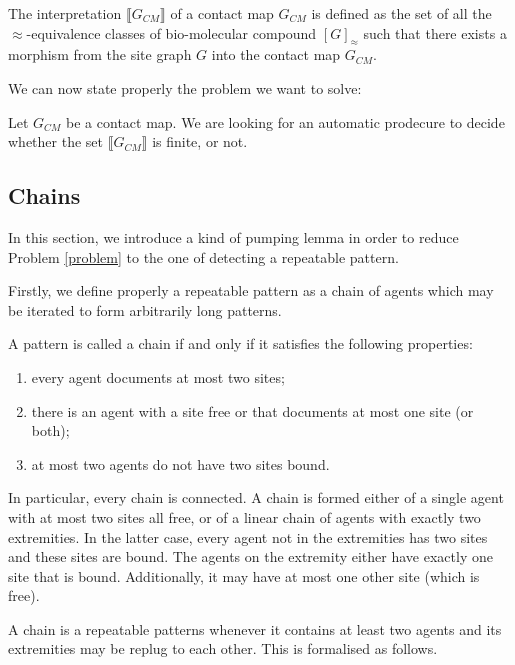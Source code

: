 \documentclass{entcs}
\newcommand{\graphsymb}{G}
\newcommand{\iso}{\approx}
\begin{document}
\begin{defn}
The interpretation $\llbracket \graphsymb_{\textit{CM}} \rrbracket$ of a contact map $\graphsymb_{\textit{CM}}$ is defined as the set of all the $\iso$-equivalence classes of bio-molecular compound $[G]_{\iso}$ such that there exists a morphism from the site graph $G$ into the contact map $\graphsymb_{\textit{CM}}$.
\end{defn}

We can now state properly the problem we want to solve:
\begin{problem}\label{problem}
Let $\graphsymb_{\textit{CM}}$ be a contact map.
We are looking for an automatic prodecure to decide whether
the set $\llbracket \graphsymb_{\textit{CM}} \rrbracket$ is finite, or not.
\end{problem}

\subsection{Chains}

In this section, we introduce a kind of pumping lemma in order to reduce
Problem \ref{problem} to the one of detecting a repeatable pattern.

Firstly, we define properly a repeatable pattern as a chain of agents which may be iterated to form arbitrarily long patterns.

\begin{defn}[Chain]
A pattern is called a chain if and only if it satisfies the following properties:
\begin{enumerate}
  \item every agent documents at most two sites;
  \item there is an agent with a site free or
  that documents at most one site (or both);
  \item at most two agents do not have two sites bound.
\end{enumerate}
\end{defn}

In particular, every chain is connected.
A chain is formed either of a single agent with at most two sites all free, or of a linear chain of agents with exactly two extremities. In the latter case, every agent not in the extremities has two sites and these sites are bound. The agents on the extremity either have exactly one site that is bound. Additionally, it may have at most one other site (which is free).

A chain is a repeatable patterns whenever it contains at least two agents and its extremities may be replug to each other. This is formalised as follows.
\end{document}
